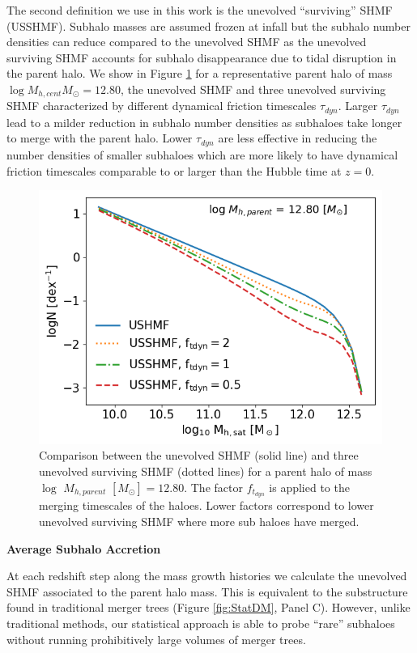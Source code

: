 The second definition we use in this work is the unevolved ``surviving'' SHMF (USSHMF). Subhalo masses are assumed frozen at infall but the subhalo number densities can reduce compared to the unevolved SHMF as the unevolved surviving SHMF accounts for subhalo disappearance due to tidal disruption in the parent halo. We show in Figure \ref{fig:SHMF_clus} for a representative parent halo of mass $\log M_{h,cent} M_{\odot} = 12.80$, the unevolved SHMF and three unevolved surviving SHMF characterized by different dynamical friction timescales $\tau_{dyn}$. Larger $\tau_{dyn}$ lead to a milder reduction in subhalo number densities as subhaloes take longer to merge with the parent halo. Lower $\tau_{dyn}$ are less effective in reducing the number densities of smaller subhaloes which are more likely to have dynamical friction timescales comparable to or larger than the Hubble time at $z = 0$.
\begin{figure}[h!]
	\centering
	\includegraphics[width = \linewidth]{Figures/Chapter2/SHMF_OneCluster.png}
	\caption{Comparison between the unevolved SHMF (solid line) and three unevolved surviving SHMF  (dotted lines) for a parent halo of mass $\log$ $M_{h,parent}$ $[M_{\odot}] = 12.80$. The factor $f_{t_{dyn}}$ is applied to the merging timescales of the haloes. Lower factors correspond to lower unevolved surviving SHMF where more sub haloes have merged.}
	\label{fig:SHMF_clus}
\end{figure}

\textbf{Average Subhalo Accretion}

At each redshift step along the mass growth histories we calculate the unevolved SHMF associated to the parent halo mass. This is equivalent to the substructure found in traditional merger trees (Figure \ref{fig:StatDM}, Panel C). However, unlike traditional methods, our statistical approach is able to probe ``rare'' subhaloes without running prohibitively large volumes of merger trees.

